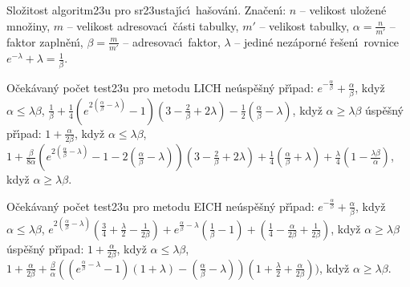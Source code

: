 \flushpar Slo\v zitost algoritm\accent23u pro sr\accent23ustaj\'\i c\'\i\ ha\v sov\'an\'\i .\newline 
Zna\v cen\'\i : $n$ -- velikost ulo\v zen\'e mno\v ziny,\newline 
$m$ -- velikost adresovac\'\i\ \v c\'asti tabulky,\newline 
$m'$ -- velikost tabulky,\newline 
$\alpha =\frac n{m'}$ -- faktor zapln\v en\'\i ,\newline 
$\beta =\frac m{m'}$ -- adresovac\'\i\ faktor,\newline 
$\lambda$ -- jedin\'e nez\'aporn\'e \v re\v sen\'\i\ rovnice $e^{
-\lambda}+\lambda =\frac 1{\beta}$.
\medskip

\flushpar O\v cek\'avan\'y po\v cet test\accent23u pro metodu LICH\newline 
ne\'usp\v e\v sn\'y p\v r\'\i pad:\newline 
\phantom{---}$e^{-\frac {\alpha}{\beta}}+\frac {
\alpha}{\beta}$, kdy\v z  $\alpha\le\lambda\beta$, \newline 
\phantom{---}$\frac 1{\beta}+\frac 14(e^{2(\frac {\alpha}{\beta}-\lambda )}-1)
(3-\frac 2{\beta}+2\lambda )-\frac 12(\frac {\alpha}{\beta}-\lambda 
)$, kdy\v z $\alpha\ge\lambda\beta$\newline 
\'usp\v e\v sn\'y p\v r\'\i pad:\newline 
\phantom{---}$1+\frac {\alpha}{2\beta}$, kdy\v z $
\alpha\le\lambda\beta$, \newline 
\phantom{---}$1+\frac {\beta}{8\alpha}(e^{2(\frac {\alpha}{\beta}-\lambda )}-1
-2(\frac {\alpha}{\beta}-\lambda ))(3-\frac 2{\beta}+2\lambda )+\frac 
14(\frac {\alpha}{\beta}+\lambda )+\frac {\lambda}4(1-\frac {\lambda
\beta}{\alpha})$, 
kdy\v z $\alpha\ge\lambda\beta$.
\medskip

\flushpar O\v cek\'avan\'y po\v cet test\accent23u pro metodu EICH\newline 
ne\'usp\v e\v sn\'y p\v r\'\i pad:\newline
\phantom{---} $e^{-\frac {\alpha}{\beta}}+\frac {
\alpha}{\beta}$, kdy\v z  $\alpha\le\lambda\beta$, \newline 
\phantom{---}$e^{2(\frac {\alpha}{\beta}-\lambda )}(\frac 34+\frac {\lambda}2-\frac 
1{2\beta})+e^{\frac {\alpha}{\beta}-\lambda}(\frac 1{\beta}-1)+(\frac 
14-\frac {\alpha}{2\beta}+\frac 1{2\beta})$, kdy\v z $\alpha\ge\lambda
\beta$\newline 
\'usp\v e\v sn\'y p\v r\'\i pad:\newline 
\phantom{---}$1+\frac {\alpha}{2\beta}$, kdy\v z $
\alpha\le\lambda\beta$, \newline 
\phantom{---}$1+\frac {\alpha}{2\beta}+\frac {\beta}{\alpha}((e^{\frac {\alpha}{
\beta}-\lambda}-1)(1+\lambda )-(\frac {\alpha}{\beta}-\lambda ))(
1+\frac {\lambda}2+\frac {\alpha}{2\beta}))$, kdy\v z $\alpha\ge\lambda
\beta$.
\medskip


